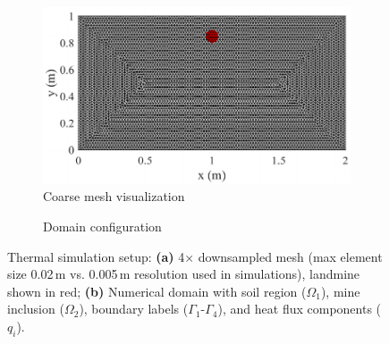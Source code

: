          \begin{figure}[htbp]
          \centering
          \begin{subfigure}[t]{0.48\textwidth} %
            \centering
            \includegraphics[width=\textwidth]{figs/Rory/thermal_mesh_new.pdf}
            \caption{Coarse mesh visualization}
            \label{fig:thermal_mesh}
          \end{subfigure}
          \hfill
          \begin{subfigure}[t]{0.48\textwidth}
            \centering
            \caption{Domain configuration}
            \label{fig:thermal_domain}
          \end{subfigure}
          \caption[Thermal simulations setup]{Thermal simulation setup: \textbf{(a)} 4× downsampled mesh (max element size 0.02\,m vs. 0.005\,m resolution used in simulations), landmine shown in red; \textbf{(b)} Numerical domain with soil region ($\Omega_1$), mine inclusion ($\Omega_2$), boundary labels ($\Gamma_1$\--$\Gamma_4$), and heat flux components ($q_i$).}
          \label{fig:thermal_setup}
        \end{figure}
    

